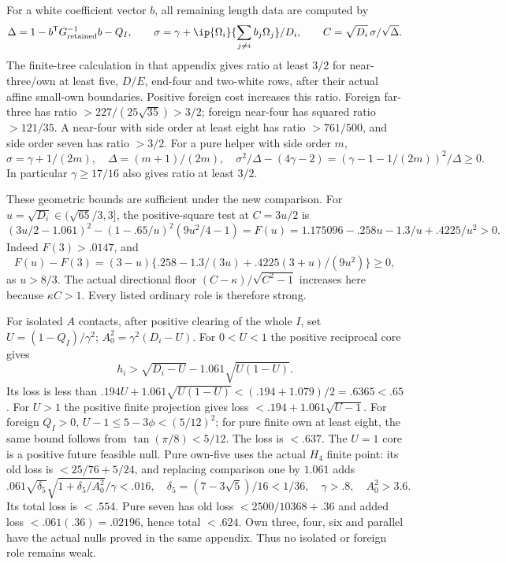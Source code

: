 For a white coefficient vector \(b\), all remaining length data
are computed by
\[
 \Delta=1-b^\mathsf TG_{\rm retained}^{-1}b-Q_I,\qquad
 \sigma=\gamma+
  \ip{\Omega_i}{\sum_{j\ne i}b_j\Omega_j}/D_i,\qquad
 C=\sqrt{D_i}\,\sigma/\sqrt\Delta .
\]
The finite-tree calculation in that appendix gives ratio at least
\(3/2\) for near-three/own at least five, \(D/E\), end-four and
two-white rows, after their actual affine small-own boundaries.
Positive foreign cost increases this ratio.
Foreign far-three has ratio \(>227/(25\sqrt{35})>3/2\);
foreign near-four has squared ratio \(>121/35\).
A near-four with side order at least eight has ratio \(>761/500\),
and side order seven has ratio \(>3/2\).
For a pure helper with side order \(m\),
\[
 \sigma=\gamma+1/(2m),\quad \Delta=(m+1)/(2m),\quad
 \sigma^2/\Delta-(4\gamma-2)
 =(\gamma-1-1/(2m))^2/\Delta\geq0 .
\]
In particular \(\gamma\geq17/16\) also gives ratio at least \(3/2\).

These geometric bounds are sufficient under the new comparison.
For \(u=\sqrt{D_i}\in(\sqrt{65}/3,3]\), the positive-square test at
\(C=3u/2\) is
\[
 (3u/2-1.061)^2-(1-.65/u)^2(9u^2/4-1)
 =F(u)=1.175096-.258u-1.3/u+.4225/u^2>0 .
\]
Indeed \(F(3)>.0147\), and
\[
 F(u)-F(3)=(3-u)
 \{.258-1.3/(3u)+.4225(3+u)/(9u^2)\}\geq0,
\]
as \(u>8/3\). The actual directional floor
\((C-\kappa)/\sqrt{C^2-1}\) increases here because \(\kappa C>1\).
Every listed ordinary role is therefore strong.

For isolated \(A\) contacts, after positive clearing of the whole
\(I\), set \(U=(1-Q_I)/\gamma^2\);
\(A_0^2=\gamma^2(D_i-U)\).
For \(0<U<1\) the positive reciprocal core gives
\[
 h_i>\sqrt{D_i-U}-1.061\sqrt{U(1-U)}.
\]
Its loss is less than
\(.194U+1.061\sqrt{U(1-U)}
 <(.194+1.079)/2=.6365<.65\).
For \(U>1\) the positive finite projection gives loss
\(<.194+1.061\sqrt{U-1}\).
For foreign \(Q_I>0\), \(U-1\leq5-3\phi<(5/12)^2\);
for pure finite own at least eight, the same bound follows from
\(\tan(\pi/8)<5/12\). The loss is \(<.637\).
The \(U=1\) core is a positive future feasible null.
Pure own-five uses the actual \(H_4\) finite point:
its old loss is \(<25/76+5/24\), and replacing comparison one by
\(1.061\) adds
\[
 .061\sqrt{\delta_5}\sqrt{1+\delta_5/A_0^2}/\gamma<.016,
 \quad \delta_5=(7-3\sqrt5)/16<1/36,\quad
 \gamma>.8,\quad A_0^2>3.6 .
\]
Its total loss is \(<.554\).
Pure seven has old loss \(<2500/10368+.36\) and added loss
\(<.061(.36)=.02196\), hence total \(<.624\).
Own three, four, six and parallel have the actual nulls proved in
the same appendix. Thus no isolated or foreign role remains weak.

